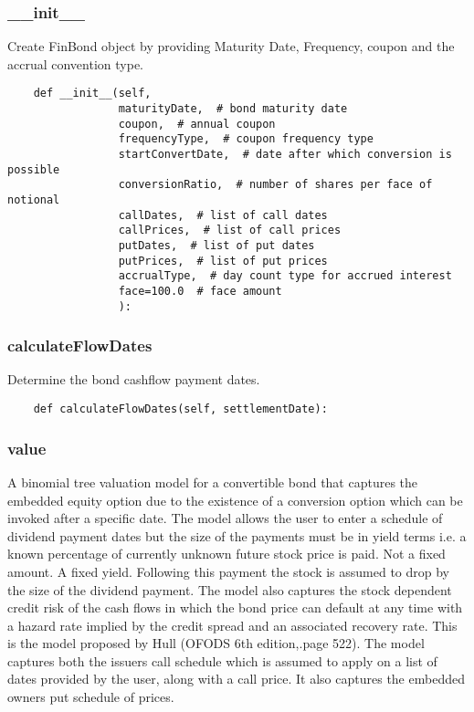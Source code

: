 \documentclass[twoside,11pt]{book}
\begin{document}
\subsubsection*{{\bf \_\_init\_\_}}
Create FinBond object by providing Maturity Date, Frequency, coupon and the accrual convention type.  

\begin{lstlisting}
    def __init__(self,
                 maturityDate,  # bond maturity date
                 coupon,  # annual coupon
                 frequencyType,  # coupon frequency type
                 startConvertDate,  # date after which conversion is possible
                 conversionRatio,  # number of shares per face of notional
                 callDates,  # list of call dates
                 callPrices,  # list of call prices
                 putDates,  # list of put dates
                 putPrices,  # list of put prices
                 accrualType,  # day count type for accrued interest
                 face=100.0  # face amount
                 ):
\end{lstlisting}

\subsubsection*{{\bf calculateFlowDates}}
Determine the bond cashflow payment dates.  

\begin{lstlisting}
    def calculateFlowDates(self, settlementDate):
\end{lstlisting}

\subsubsection*{{\bf value}}
 A binomial tree valuation model for a convertible bond that captures the embedded equity option due to the existence of a conversion option which can be invoked after a specific date.  The model allows the user to enter a schedule of dividend payment dates but the size of the payments must be in yield terms i.e. a known percentage of currently unknown future stock price is paid. Not a fixed amount. A fixed yield. Following this payment the stock is assumed to drop by the size of the dividend payment.  The model also captures the stock dependent credit risk of the cash flows in which the bond price can default at any time with a hazard rate implied by the credit spread and an associated recovery rate. This is the model proposed by Hull (OFODS 6th edition,.page 522).  The model captures both the issuers call schedule which is assumed to apply on a list of dates provided by the user, along with a call price. It also captures the embedded owners put schedule of prices.  
\end{document}
